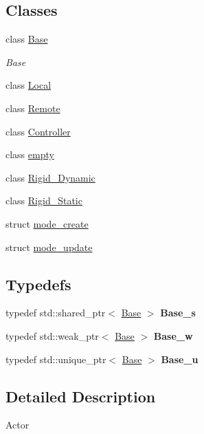 \subsection*{Classes}
\begin{DoxyCompactItemize}
\item 
class \hyperlink{classNeb_1_1Actor_1_1Base}{Base}
\begin{DoxyCompactList}\small\item\em Base \end{DoxyCompactList}\item 
class \hyperlink{classNeb_1_1Actor_1_1Local}{Local}
\item 
class \hyperlink{classNeb_1_1Actor_1_1Remote}{Remote}
\item 
class \hyperlink{classNeb_1_1Actor_1_1Controller}{Controller}
\item 
class \hyperlink{classNeb_1_1Actor_1_1empty}{empty}
\item 
class \hyperlink{classNeb_1_1Actor_1_1Rigid__Dynamic}{Rigid\-\_\-\-Dynamic}
\item 
class \hyperlink{classNeb_1_1Actor_1_1Rigid__Static}{Rigid\-\_\-\-Static}
\item 
struct \hyperlink{structNeb_1_1Actor_1_1mode__create}{mode\-\_\-create}
\item 
struct \hyperlink{structNeb_1_1Actor_1_1mode__update}{mode\-\_\-update}
\end{DoxyCompactItemize}
\subsection*{Typedefs}
\begin{DoxyCompactItemize}
\item 
\hypertarget{namespaceNeb_1_1Actor_a8f702ef70e4e45d7cb06e9e4e7382e85}{typedef std\-::shared\-\_\-ptr$<$ \hyperlink{classNeb_1_1Actor_1_1Base}{Base} $>$ {\bfseries Base\-\_\-s}}\label{namespaceNeb_1_1Actor_a8f702ef70e4e45d7cb06e9e4e7382e85}

\item 
\hypertarget{namespaceNeb_1_1Actor_afaf94cd97cc0a89949bc901866541de6}{typedef std\-::weak\-\_\-ptr$<$ \hyperlink{classNeb_1_1Actor_1_1Base}{Base} $>$ {\bfseries Base\-\_\-w}}\label{namespaceNeb_1_1Actor_afaf94cd97cc0a89949bc901866541de6}

\item 
\hypertarget{namespaceNeb_1_1Actor_a312611dc04f46dfc82e4e1b21cdb4c6d}{typedef std\-::unique\-\_\-ptr$<$ \hyperlink{classNeb_1_1Actor_1_1Base}{Base} $>$ {\bfseries Base\-\_\-u}}\label{namespaceNeb_1_1Actor_a312611dc04f46dfc82e4e1b21cdb4c6d}

\end{DoxyCompactItemize}


\subsection{Detailed Description}
Actor 